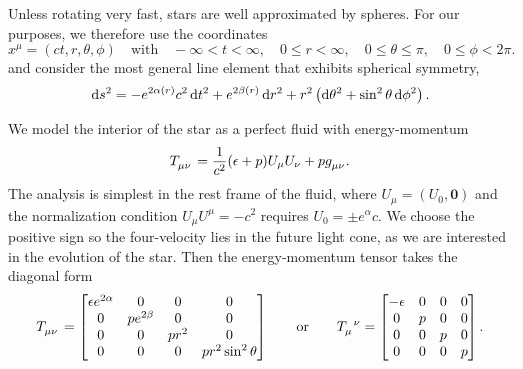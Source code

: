 Unless rotating very fast, stars are well approximated by spheres.
For our purposes, we therefore use the coordinates
\begin{equation}
	x^\mu = (c t, r, \theta, \phi)
	\quad \text{with} \quad
	-\infty < t < \infty, \quad
	0 \leq r < \infty, \quad
	0 \leq \theta \leq \pi, \quad
	0 \leq \phi < 2 \pi .
\end{equation}
and consider the most general line element that exhibits spherical symmetry, \cite[equation 5.11]{ref:carroll}
\begin{equation}
	\mathop{}\!\mathrm{d} s^2 = -e^{2 \alpha(r)} c^2 \mathop{}\!\mathrm{d} t^2 + e^{2 \beta(r)} \mathop{}\!\mathrm{d} r^2 + r^2 \left( \mathop{}\!\mathrm{d} \theta^2 + \sin^2 \theta \mathop{}\!\mathrm{d} \phi^2 \right) .
\end{equation}

We model the interior of the star as a perfect fluid with energy-momentum \cite[equation 1.114]{ref:carroll}
\begin{equation}
	T\indices{_\mu_\nu} = \frac{1}{c^2} (\epsilon+p) U_\mu U_\nu + p g\indices{_\mu_\nu}.
	\label{eq:tov:energy_momentum_perfect_fluid}
\end{equation}
The analysis is simplest in the rest frame of the fluid, where $U_\mu = (U_0, \textbf{0})$ and the normalization condition $U_\mu U^\mu = -c^2$ requires $U_0 = \pm e^\alpha c$.
We choose the positive sign so the four-velocity lies in the future light cone, as we are interested in the evolution of the star.
Then the energy-momentum tensor takes the diagonal form
\begin{equation}
T\indices{_\mu_\nu} =
\begin{bmatrix}
	\epsilon e^{2\alpha} & 0            & 0     & 0                   \\
	0                    & p e^{2\beta} & 0     & 0                   \\
	0                    & 0            & p r^2 & 0                   \\
	0                    & 0            & 0     & p r^2 \sin^2 \theta \\
\end{bmatrix}
\qquad \text{or} \qquad
T\indices{_\mu^\nu} =
\begin{bmatrix}
	-\epsilon & 0 & 0 & 0 \\
	0         & p & 0 & 0 \\
	0         & 0 & p & 0 \\
	0         & 0 & 0 & p \\
\end{bmatrix}
.
\label{eq:einstein_to_tov:T}
\end{equation}

